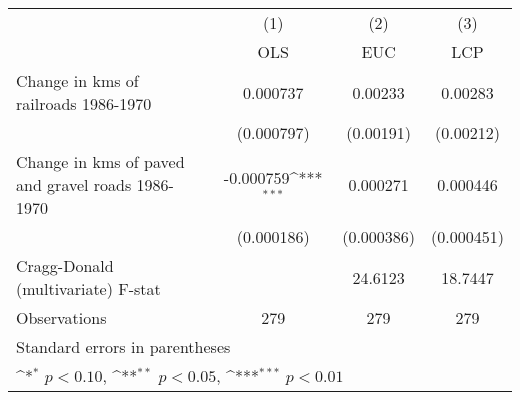 {
\def\sym#1{\ifmmode^{#1}\else\(^{#1}\)\fi}
\begin{tabular}{l*{3}{c}}
\hline\hline
                &\multicolumn{1}{c}{(1)}&\multicolumn{1}{c}{(2)}&\multicolumn{1}{c}{(3)}\\
                &\multicolumn{1}{c}{OLS}&\multicolumn{1}{c}{EUC}&\multicolumn{1}{c}{LCP}\\
\hline
Change in kms of railroads 1986-1970& 0.000737         &  0.00233         &  0.00283         \\
                &(0.000797)         &(0.00191)         &(0.00212)         \\
[1em]
Change in kms of paved and gravel roads 1986-1970&-0.000759\sym{***}& 0.000271         & 0.000446         \\
                &(0.000186)         &(0.000386)         &(0.000451)         \\
\hline
Cragg-Donald (multivariate) F-stat&                  &  24.6123         &  18.7447         \\
Observations    &      279         &      279         &      279         \\
\hline\hline
\multicolumn{4}{l}{\footnotesize Standard errors in parentheses}\\
\multicolumn{4}{l}{\footnotesize \sym{*} \(p<0.10\), \sym{**} \(p<0.05\), \sym{***} \(p<0.01\)}\\
\end{tabular}
}
